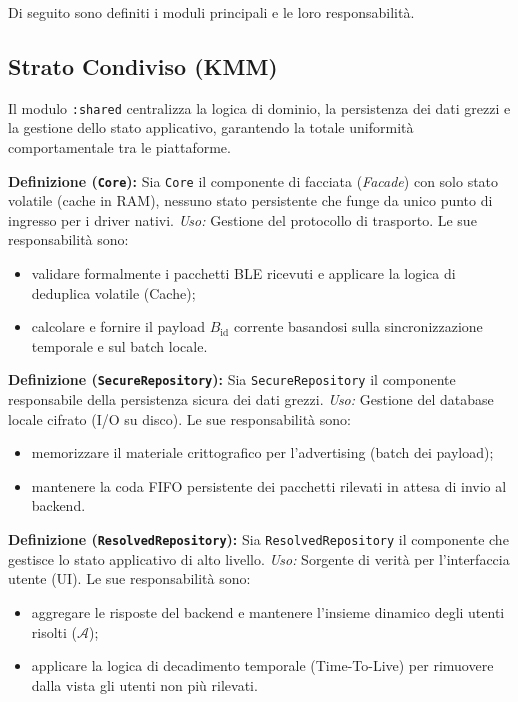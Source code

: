 \documentclass[a4paper,11pt,table,dvipsnames]{article}
\begin{document}
Di seguito sono definiti i moduli principali e le loro responsabilità.

\subsection{Strato Condiviso (KMM)}
Il modulo \texttt{:shared} centralizza la logica di dominio, la persistenza dei dati grezzi e la gestione dello stato applicativo, garantendo la totale uniformità comportamentale tra le piattaforme.

\textbf{Definizione (\texttt{Core}):}
Sia \texttt{Core} il componente di facciata (\emph{Facade}) con solo stato volatile (cache in RAM), nessuno stato persistente che funge da unico punto di ingresso per i driver nativi.
\emph{Uso:} Gestione del protocollo di trasporto. Le sue responsabilità sono:
\begin{itemize}
    \item validare formalmente i pacchetti BLE ricevuti e applicare la logica di deduplica volatile (Cache);
    \item calcolare e fornire il payload \(B_{\text{id}}\) corrente basandosi sulla sincronizzazione temporale e sul batch locale.
\end{itemize}

\textbf{Definizione (\texttt{SecureRepository}):}
Sia \texttt{SecureRepository} il componente responsabile della persistenza sicura dei dati grezzi.
\emph{Uso:} Gestione del database locale cifrato (I/O su disco). Le sue responsabilità sono:
\begin{itemize}
    \item memorizzare il materiale crittografico per l'advertising (batch dei payload);
    \item mantenere la coda FIFO persistente dei pacchetti rilevati in attesa di invio al backend.
\end{itemize}

\textbf{Definizione (\texttt{ResolvedRepository}):}
Sia \texttt{ResolvedRepository} il componente che gestisce lo stato applicativo di alto livello.
\emph{Uso:} Sorgente di verità per l'interfaccia utente (UI). Le sue responsabilità sono:
\begin{itemize}
    \item aggregare le risposte del backend e mantenere l'insieme dinamico degli utenti risolti (\(\mathcal{A}\));
    \item applicare la logica di decadimento temporale (Time-To-Live) per rimuovere dalla vista gli utenti non più rilevati.
\end{itemize}
\end{document}
